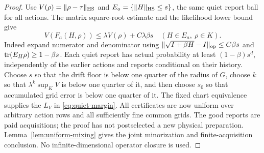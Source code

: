 \begin{proof}
Use $V(\rho)=\lVert\rho-\tau\rVert_{\mathrm{HS}}$ and $E_a=\{\lVert H\rVert_{\mathrm{HS}}\le s\}$, the same quiet report ball for all actions. The matrix square-root estimate and the likelihood lower bound give
\[
 V(F_a(H,\rho))\le\lambda V(\rho)+C\lambda\beta s
       \quad(H\in E_a,\ \rho\in K).
\]
Indeed expand numerator and denominator using
$\lVert\sqrt{I+\beta H}-I\rVert_{\rm op}\le C\beta s$ and
$\operatorname{tr}(E_H\rho)\ge1-\beta s$. Each quiet report has actual probability at least $(1-\beta)s^d$, independently of the earlier actions and reports conditional on their history. Choose $s$ so that the drift floor is below one quarter of the radius of $G$, choose $k$ so that $\lambda^k\sup_KV$ is below one quarter of it, and then choose $s_0$ so that accumulated grid error is below one quarter of it. The fixed chart equivalence supplies the $L_V$ in \eqref{eq:quiet-margin}. All certificates are now uniform over arbitrary action rows and all sufficiently fine common grids. The good reports are paid acquisitions; the proof has not postselected a new physical preparation. Lemma~\ref{lem:uniform-mixing} gives the joint minorization and finite-acquisition conclusion. No infinite-dimensional operator closure is used.
\end{proof}
